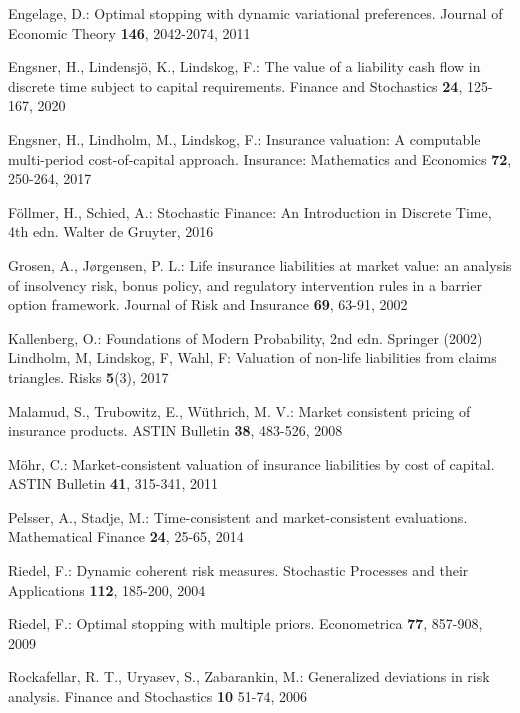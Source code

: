 \documentclass[11pt,a4paper]{article}
\begin{document}
\begin{thebibliography}{}
Engelage, D.:
Optimal stopping with dynamic variational preferences.
Journal of Economic Theory {\bf 146}, 2042-2074, 2011

Engsner, H., Lindensj\"o, K., Lindskog, F.:
The value of a liability cash flow in discrete time subject to capital requirements.
Finance and Stochastics {\bf 24}, 125-167, 2020

Engsner, H., Lindholm, M., Lindskog, F.:
Insurance valuation: A computable multi-period cost-of-capital approach.
Insurance: Mathematics and Economics {\bf 72}, 250-264, 2017 

F\"ollmer, H., Schied, A.:
Stochastic Finance: An Introduction in Discrete Time, 4th edn. 
Walter de Gruyter, 2016

Grosen, A., J{\o}rgensen, P. L.: 
Life insurance liabilities at market value: an analysis of insolvency risk, bonus policy, and regulatory intervention rules in a barrier option framework.
Journal of Risk and Insurance {\bf 69}, 63-91, 2002

Kallenberg, O.:
Foundations of Modern Probability, 2nd edn.
Springer (2002)
Lindholm, M, Lindskog, F, Wahl, F: Valuation of non-life liabilities from claims triangles. 
Risks {\bf 5}(3), 2017 

Malamud, S., Trubowitz, E., W\"uthrich, M. V.:
Market consistent pricing of insurance products.
ASTIN Bulletin {\bf 38}, 483-526, 2008

M\"ohr, C.: 
Market-consistent valuation of insurance liabilities by cost of capital.
ASTIN Bulletin {\bf 41}, 315-341, 2011

Pelsser, A., Stadje, M.: 
Time-consistent and market-consistent evaluations.
Mathematical Finance {\bf 24}, 25-65, 2014 

Riedel, F.: 
Dynamic coherent risk measures.
Stochastic Processes and their Applications {\bf 112}, 185-200, 2004

Riedel, F.: 
Optimal stopping with multiple priors.
Econometrica {\bf 77}, 857-908, 2009

Rockafellar, R. T., Uryasev, S., Zabarankin, M.:
Generalized deviations in risk analysis.
Finance and Stochastics {\bf 10} 51-74, 2006


\end{thebibliography}
\end{document}
